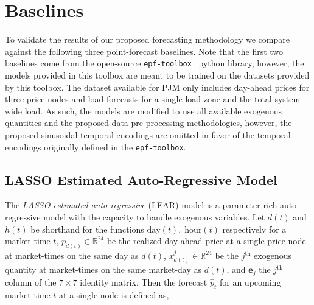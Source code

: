 \section{Baselines}\label{sec:baselines}

To validate the results of our proposed forecasting methodology we compare against the following three point-forecast
baselines.
Note that the first two baselines come from the open-source \texttt{epf-toolbox}~\cite{epftoolbox} python library,
however, the models provided in this toolbox are meant to be trained on the datasets provided by this toolbox.
The dataset available for PJM only includes day-ahead prices for three price nodes and load forecasts for a single
load zone and the total system-wide load.
As such, the models are modified to use all available exogenous quantities and the
proposed data pre-processing methodologies, however, the proposed sinusoidal temporal encodings are omitted in favor of
the temporal encodings originally defined in the \texttt{epf-toolbox}.

\subsection{LASSO Estimated Auto-Regressive Model}\label{subsec:lasso-estimated-auto-regressive}

The \textit{LASSO estimated auto-regressive} (LEAR) model is a parameter-rich auto-regressive model with the capacity to handle
exogenous variables.
Let $d(t)$ and $h(t)$ be shorthand for the functions $\text{day}(t),\; \text{hour}(t)$ respectively for a market-time
$t$, $p_{d(t)} \in \mathbb{R}^{24}$ be the realized day-ahead price at a single price node at market-times on the same
day as $d(t)$, $x^j_{d(t)} \in \mathbb{R}^{24}$ be the $j^{\text{th}}$ exogenous quantity at market-times on the same market-day
as $d(t)$, and $\textbf{e}_{j}$ the $j^{\text{th}}$ column of the $7\times7$ identity matrix.
Then the forecast $\hat{p}_t$ for an upcoming market-time $t$ at a single node is defined as,


